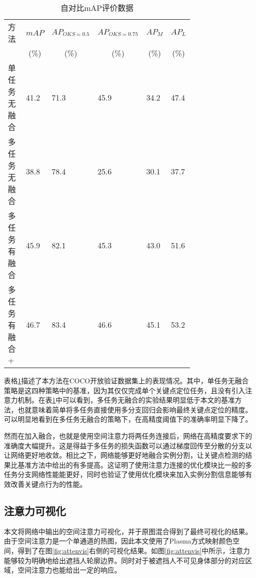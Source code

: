 \begin{table}[ht]
	\centering
	\caption{自对比mAP评价数据}
	\label{tab:mAPCOCOselfbenchmark}
	\begin{minipage}{0.8\linewidth}
		\begin{tabular}{p{0.25\linewidth}p{0.1\linewidth}<{\centering}p{0.1\linewidth}<{\centering}p{0.1\linewidth}<{\centering}p{0.1\linewidth}<{\centering}p{0.1\linewidth}<{\centering}}
			\hline
			方法 & \multicolumn{1}{c}{$mAP$} & \multicolumn{1}{c}{$AP_{OKS=0.5}$} & \multicolumn{1}{c}{$AP_{OKS=0.75}$} 
			& \multicolumn{1}{c}{$AP_M$} & \multicolumn{1}{c}{$AP_L$} \\
			
			& \multicolumn{1}{c}{(\%)}& \multicolumn{1}{c}{(\%)}&
			\multicolumn{1}{c}{(\%)}& \multicolumn{1}{c}{(\%)}& \multicolumn{1}{c}{
				(\%)}\\
			\hline
			单任务无融合 & 41.2 & 71.3 & 45.9& 34.2& 47.4\\
			多任务无融合 & 38.8 & 78.4 & 25.6 & 30.1 & 37.7 \\
			多任务有融合 & 45.9 & 82.1 & 45.3 & 43.0 & 51.6 \\
			多任务有融合+ & 46.7 & 83.4 & 46.6 & 45.1 & 53.2 \\
			\hline
		\end{tabular}
	\end{minipage}
\end{table}

表格\ref{tab:mAPCOCOselfbenchmark}描述了本方法在COCO开放验证数据集上的表现情况。其中，单任务无融合策略是这四种策略中的基准，因为其仅仅完成单个关键点定位任务，且没有引入注意力机制。在表\ref{tab:mAPCOCOselfbenchmark}中可以看到，多任务无融合的实验结果明显低于本文的基准方法，也就意味着简单将多任务直接使用多分支回归会影响最终关键点定位的精度。可以明显地看到在多任务无融合的策略下，在高精度阈值下的准确率明显下降了。

然而在加入融合，也就是使用空间注意力将两任务连接后，网络在高精度要求下的准确度大幅提升。这是得益于多任务的损失函数可以通过梯度回传至分散的分支以让网络更好地收敛。相比之下，网络能够更好地融合实例分割，让关键点检测的结果比基准方法中给出的有多提高。这证明了使用注意力连接的优化模块比一般的多任务分支网络性能能更好，同时也验证了使用优化模块来加入实例分割信息能够有效改善关键点行为的性能。

\subsection{注意力可视化}
\label{sec:weaksuperatten}
本文将网络中输出的空间注意力可视化，并于原图混合得到了最终可视化的结果。由于空间注意力是一个单通道的热图，因此本文使用了Plasma方式映射颜色空间，得到了在图\ref{fig:attenvis}右侧的可视化结果。如图\ref{fig:attenvis}中所示，注意力能够较为明确地给出遮挡人轮廓边界。同时对于被遮挡人不可见身体部分的对应区域，空间注意力也能给出一定的响应。

